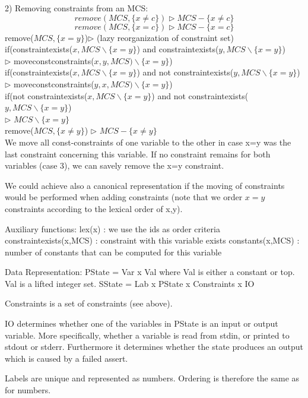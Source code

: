 2) Removing constraints from an MCS:
\[remove(MCS,\{x\neq c\})\rhd MCS-\{x\neq c\}\]
\[remove(MCS,\{x=c\})\rhd MCS-\{x=c\}\]
remove($MCS,\{x=y\}$)$\rhd$  (lazy reorganization of constraint set)\\
  if(constraintexists($x,MCS\backslash\{x=y\}$) and constraintexists($y,MCS\backslash\{x=y\}$)\\
     $\rhd$  moveconstconstraints($x,y,MCS)\backslash\{x=y\}$)\\
  if(constraintexists($x,MCS\backslash\{x=y\}$) and not constraintexists($y,MCS\backslash\{x=y\}$)\\
     $\rhd$  moveconstconstraints($y,x,MCS)\backslash\{x=y\}$)\\
  if(not constraintexists($x,MCS\backslash\{x=y\}$) and not constraintexists($y,MCS\backslash\{x=y\}$)\\
     $\rhd$  $MCS\backslash\{x=y\}$\\
remove($MCS,\{x\neq y\}$) $\rhd$ $MCS-\{x\neq y\}$\\

We move all const-constraints of one variable to the other in case x=y was the last constraint concerning this variable. If no constraint remains for both variables (case 3), we can savely remove the x=y constraint.

We could achieve also a canonical representation if the moving of constraints would be performed when adding constraints (note that we order $x=y$ constraints according to the lexical order of x,y).

Auxiliary functions:
lex(x) : we use the ids as order criteria 
constraintexists(x,MCS) : constraint with this variable exists
constants(x,MCS) : number of constants that can be computed for this variable


Data Representation:
PState = Var x Val where Val is either a constant or top. Val is a lifted integer set.
SState = Lab x PState x Constraints x IO

Constraints is a set of constraints (see above).

IO determines whether one of the variables in PState is an input or output variable. More specifically, whether a variable is read from stdin, or printed to stdout or stderr. Furthermore it determines whether the state produces an output which is caused by a failed assert.


Labels are unique and represented as numbers. Ordering is therefore the same as for numbers.

